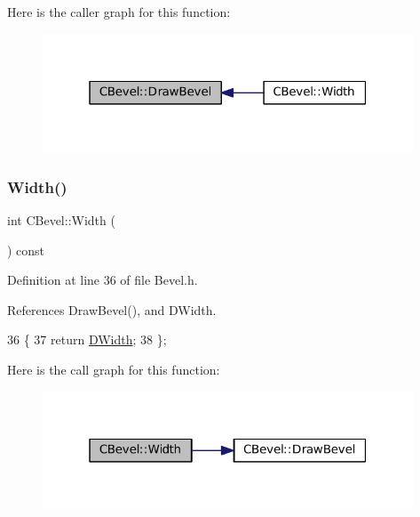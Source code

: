 Here is the caller graph for this function\+:\nopagebreak
\begin{figure}[H]
\begin{center}
\leavevmode
\includegraphics[width=313pt]{classCBevel_a407870821f37aa77621723116e979c4c_icgraph}
\end{center}
\end{figure}
\hypertarget{classCBevel_a40e07306be05c5683ceb9db1aa200f6a}{}\label{classCBevel_a40e07306be05c5683ceb9db1aa200f6a} 
\subsubsection{\texorpdfstring{Width()}{Width()}}
{\footnotesize\ttfamily int C\+Bevel\+::\+Width (\begin{DoxyParamCaption}{ }\end{DoxyParamCaption}) const\hspace{0.3cm}{\ttfamily [inline]}}



Definition at line 36 of file Bevel.\+h.



References Draw\+Bevel(), and D\+Width.


\begin{DoxyCode}
36                          \{
37             \textcolor{keywordflow}{return} \hyperlink{classCBevel_a891dccc1828c48e5e7a475ca33080060}{DWidth};
38         \};
\end{DoxyCode}
Here is the call graph for this function\+:\nopagebreak
\begin{figure}[H]
\begin{center}
\leavevmode
\includegraphics[width=313pt]{classCBevel_a40e07306be05c5683ceb9db1aa200f6a_cgraph}
\end{center}
\end{figure}


